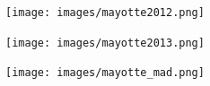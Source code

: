 \documentclass[8pt]{beamer}
\begin{document}




\vspace*{-6.5mm}
\begin{frame}[plain]
\hspace*{-11mm}
    \texttt{[image: images/mayotte2012.png]}
\end{frame}

\vspace*{-6.5mm}
\begin{frame}[plain]
\hspace*{-11mm}
    \texttt{[image: images/mayotte2013.png]}
\end{frame}

\vspace*{-6.5mm}
\begin{frame}[plain]
\hspace*{-11mm}
    \texttt{[image: images/mayotte\_mad.png]}
\end{frame}
\end{document}
